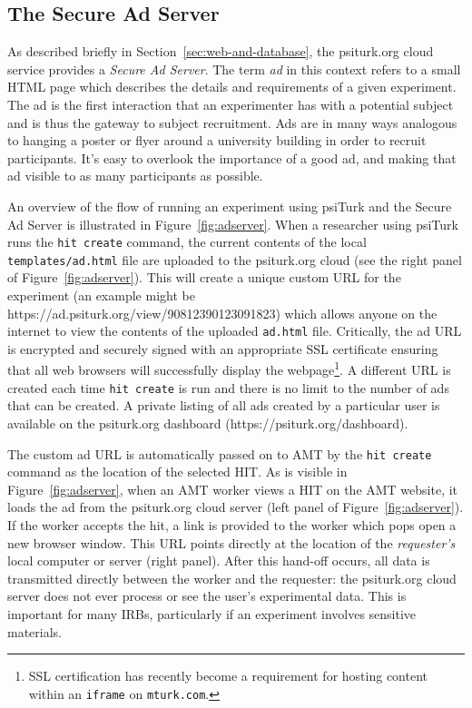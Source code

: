 \documentclass[twocolumn]{svjour3}          %
\newcommand{\psiturk}[0]{\textsf{psiTurk}}
\begin{document}
\subsection{The Secure Ad Server}
\label{sec:adserver}

As described briefly in Section~\ref{sec:web-and-database}, the \textsf{psiturk.org}
cloud service provides a \emph{Secure Ad Server}.  The term \emph{ad} in this context
refers to a small HTML page which describes the details and requirements of a
given experiment.  The ad is the first interaction that an experimenter has
with a potential subject and is thus the gateway to subject recruitment. Ads
are in many ways analogous to hanging a poster or flyer around a university
building in order to recruit participants. It's easy to overlook the importance
of a good ad, and making that ad visible to as many participants as possible.

An overview of the flow of running an experiment using
\psiturk{} and the Secure Ad Server is illustrated in
Figure~\ref{fig:adserver}.  When a researcher using \psiturk{}
runs the \texttt{hit create} command, the current contents of the local
\texttt{templates/ad.html} file are uploaded to the \textsf{psiturk.org} cloud (see
the right panel of Figure~\ref{fig:adserver}).
This will create a unique custom URL for the experiment (an example might be
\textsf{https://ad.psiturk.org/view/90812390123091823}) which
allows anyone on the internet to view the contents of the uploaded \texttt{ad.html}
file.  Critically, the ad URL is encrypted and
securely signed with an appropriate SSL certificate ensuring that all
web browsers will successfully display the webpage\footnote{SSL certification has recently become a requirement for hosting content within an \texttt{iframe} on \texttt{mturk.com}.}. A different URL is created each time \texttt{hit create}
is run and there is no limit to the number of ads that can be created.  A private listing of all ads created by a particular user is available on the \textsf{psiturk.org} dashboard (\textsf{https://psiturk.org/dashboard}).

The custom ad URL is automatically passed
on to AMT by the \texttt{hit create} command as the location of
the selected HIT.  As is visible in Figure~\ref{fig:adserver},
when an AMT worker views a HIT on the AMT
website, it loads the ad from the \textsf{psiturk.org} cloud server (left panel of Figure~\ref{fig:adserver}).  If the worker accepts
the hit, a link is provided to the worker which pops open a new browser
window.  This URL points directly at the location of the \emph{requester's} local computer
or server (right panel).  After this hand-off occurs, all data is transmitted directly between the worker
and the requester: the \textsf{psiturk.org} cloud server does not ever
process or see the user's experimental data.  This is important for many IRBs,
particularly if an experiment involves sensitive materials.
\end{document}
